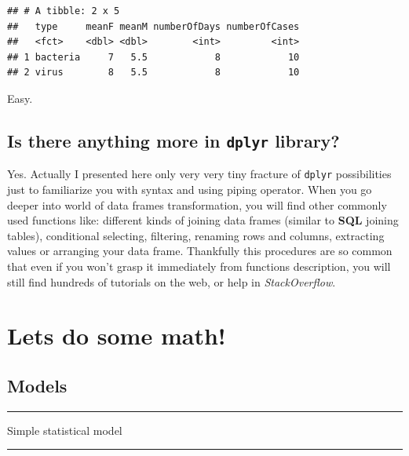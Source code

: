 \documentclass[]{book}
\theoremstyle{definition}
\theoremstyle{definition}
\theoremstyle{definition}
\theoremstyle{remark}
\begin{document}
\begin{verbatim}
## # A tibble: 2 x 5
##   type     meanF meanM numberOfDays numberOfCases
##   <fct>    <dbl> <dbl>        <int>         <int>
## 1 bacteria     7   5.5            8            10
## 2 virus        8   5.5            8            10
\end{verbatim}

Easy.

\section{\texorpdfstring{Is there anything more in \texttt{dplyr}
library?}{Is there anything more in dplyr library?}}\label{is-there-anything-more-in-dplyr-library}

Yes. Actually I presented here only very very tiny fracture of
\texttt{dplyr} possibilities just to familiarize you with syntax and
using piping operator. When you go deeper into world of data frames
transformation, you will find other commonly used functions like:
different kinds of joining data frames (similar to \textbf{SQL} joining
tables), conditional selecting, filtering, renaming rows and columns,
extracting values or arranging your data frame. Thankfully this
procedures are so common that even if you won't grasp it immediately
from functions description, you will still find hundreds of tutorials on
the web, or help in \emph{StackOverflow}.

\chapter{Lets do some math!}\label{lets-do-some-math}

\section{Models}\label{models}

\begin{center}\rule{0.5\linewidth}{\linethickness}\end{center}

\begin{center}
\begingroup\Large
Simple statistical model  
\endgroup
\end{center}

\begin{center}\rule{0.5\linewidth}{\linethickness}\end{center}
\end{document}
